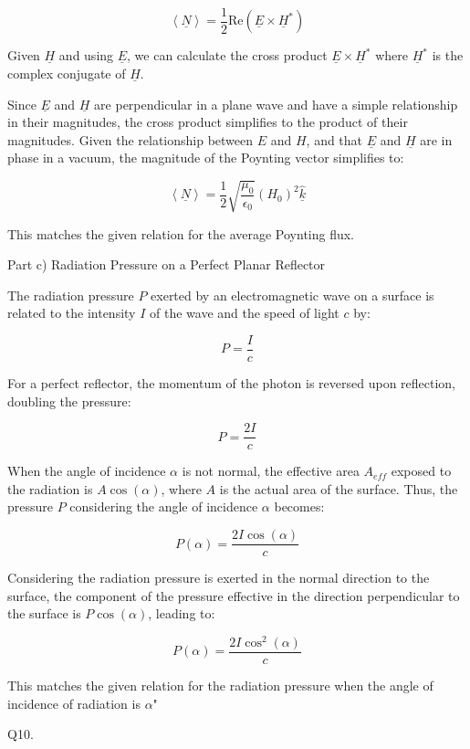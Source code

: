 \[
\left< \underline{N} \right> = \frac{1}{2} \text{Re}(\underline{E} \times \underline{H}^*)
\]

Given \(\underline{H}\) and using \(\underline{E}\), we can calculate the cross product \(\underline{E} \times \underline{H}^*\) where \(\underline{H}^*\) is the complex conjugate of \(\underline{H}\).

Since \(\underline{E}\) and \(\underline{H}\) are perpendicular in a plane wave and have a simple relationship in their magnitudes, the cross product simplifies to the product of their magnitudes. Given the relationship between \(E\) and \(H\), and that \(\underline{E}\) and \(\underline{H}\) are in phase in a vacuum, the magnitude of the Poynting vector simplifies to:

\[
\left< \underline{N} \right> = \frac{1}{2} \sqrt{\frac{\mu_{0}}{\epsilon_{0}}} (H_{0})^{2} \hat{\underline{k}}
\]

This matches the given relation for the average Poynting flux.

Part c) Radiation Pressure on a Perfect Planar Reflector

The radiation pressure \( P\) exerted by an electromagnetic wave on a surface is related to the intensity \(I\) of the wave and the speed of light \(c\) by:

\[
P = \frac{I}{c}
\]

For a perfect reflector, the momentum of the photon is reversed upon reflection, doubling the pressure:

\[
P = \frac{2I}{c}
\]

When the angle of incidence \(\alpha\) is not normal, the effective area \(A_{eff}\) exposed to the radiation is \(A\cos(\alpha)\), where \(A\) is the actual area of the surface. Thus, the pressure \(P\) considering the angle of incidence \(\alpha\) becomes:

\[
P(\alpha) = \frac{2I\cos(\alpha)}{c}
\]

Considering the radiation pressure is exerted in the normal direction to the surface, the component of the pressure effective in the direction perpendicular to the surface is \(P\cos(\alpha)\), leading to:

\[
P(\alpha) = \frac{2I\cos^{2}(\alpha)}{c}
\]

This matches the given relation for the radiation pressure when the angle of incidence of radiation is \(\alpha\)"

                              Q10. 

